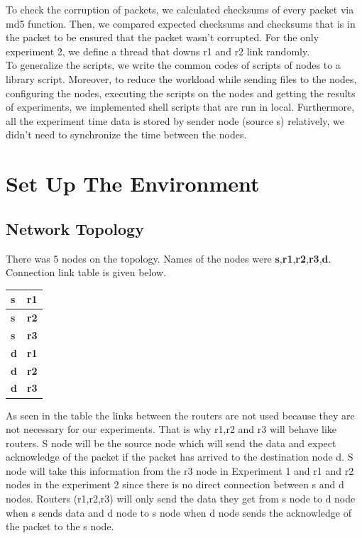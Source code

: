 \documentclass[conference]{IEEEtran}
\begin{document}
To check the corruption of packets, we calculated checksums of every packet via md5 function. Then, we compared expected checksums and checksums that is in the packet to be ensured that the packet wasn't corrupted. For the only experiment 2, we define a thread that downs r1 and r2 link randomly. \\

To generalize the scripts, we write the common codes of scripts of nodes to a library script. Moreover, to reduce the workload while sending files to the nodes, configuring the nodes, executing the scripts on the nodes and getting the results of experiments, we implemented shell scripts that are run in local. Furthermore, all the experiment time data is stored by sender node (source s) relatively, we didn't need to synchronize the time between the nodes.

\section{Set Up The Environment}
\subsection{Network Topology}
There was 5 nodes on the topology. Names of the nodes were \textbf{s},\textbf{r1},\textbf{r2},\textbf{r3},\textbf{d}.
Connection link table is given below.
\begin{table}[ht]
\centering
\begin{tabular}{|l|l|}
\hline
\textbf{s}  & \textbf{r1} \\ \hline
\textbf{s}  & \textbf{r2} \\ \hline
\textbf{s}  & \textbf{r3} \\ \hline
\textbf{d}  & \textbf{r1} \\ \hline
\textbf{d}  & \textbf{r2} \\ \hline
\textbf{d}  & \textbf{r3} \\ \hline
\end{tabular}
\end{table}
As seen in the table the links between the routers are not used because they are not necessary for our experiments. That is why r1,r2 and r3 will behave like routers. S node will be the source node which will send the data and expect acknowledge of the packet if the packet has arrived to the destination node d. S node will take this information from the r3 node in Experiment 1 and r1 and r2 nodes in the experiment 2 since there is no direct connection between s and d nodes. Routers (r1,r2,r3) will only send the data they get from s node to d node when s sends data and d node to s node when d node sends the acknowledge of the packet to the s node.\\
\end{document}
